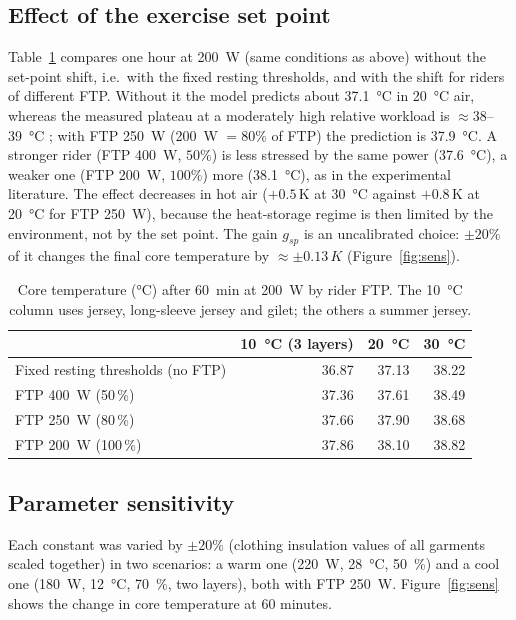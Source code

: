 \documentclass[11pt,a4paper]{article}
\begin{document}
\subsection{Effect of the exercise set point}
\label{sec:setpoint-results}
Table~\ref{tab:setpoint} compares one hour at \SI{200}{W} (same conditions as above) without the set-point shift, i.e.\ with the fixed resting thresholds, and with the shift for riders of different FTP. Without it the model predicts about \SI{37.1}{\degreeCelsius} in \SI{20}{\degreeCelsius} air, whereas the measured plateau at a moderately high relative workload is \(\approx38\)--\SI{39}{\degreeCelsius} \citep{saltin1966}; with FTP \SI{250}{W} (\SI{200}{W} \(=80\%\) of FTP) the prediction is \SI{37.9}{\degreeCelsius}. A stronger rider (FTP \SI{400}{W}, \(50\%\)) is less stressed by the same power (\SI{37.6}{\degreeCelsius}), a weaker one (FTP \SI{200}{W}, \(100\%\)) more (\SI{38.1}{\degreeCelsius}), as in the experimental literature. The effect decreases in hot air (\(+0.5\)\,K at \SI{30}{\degreeCelsius} against \(+0.8\)\,K at \SI{20}{\degreeCelsius} for FTP \SI{250}{W}), because the heat-storage regime is then limited by the environment, not by the set point. The gain \(g_{sp}\) is an uncalibrated choice: \(\pm20\%\) of it changes the final core temperature by \(\approx\pm0.13\,\si{K}\) (Figure~\ref{fig:sens}).

\begin{table}[H]
\centering\small
\begin{tabular}{@{}lrrr@{}}
\toprule
 & \SI{10}{\degreeCelsius} (3 layers) & \SI{20}{\degreeCelsius} & \SI{30}{\degreeCelsius} \\
\midrule
Fixed resting thresholds (no FTP) & 36.87 & 37.13 & 38.22 \\
FTP \SI{400}{W} (50\,\%) & 37.36 & 37.61 & 38.49 \\
FTP \SI{250}{W} (80\,\%) & 37.66 & 37.90 & 38.68 \\
FTP \SI{200}{W} (100\,\%) & 37.86 & 38.10 & 38.82 \\
\bottomrule
\end{tabular}
\caption{Core temperature (\si{\degreeCelsius}) after \SI{60}{min} at \SI{200}{W} by rider FTP. The \SI{10}{\degreeCelsius} column uses jersey, long-sleeve jersey and gilet; the others a summer jersey.}\label{tab:setpoint}
\end{table}

\subsection{Parameter sensitivity}
\label{sec:thermal-sens}
Each constant was varied by \(\pm20\%\) (clothing insulation values of all garments scaled together) in two scenarios: a warm one (\SI{220}{W}, \SI{28}{\degreeCelsius}, \SI{50}{\percent}) and a cool one (\SI{180}{W}, \SI{12}{\degreeCelsius}, \SI{70}{\percent}, two layers), both with FTP \SI{250}{W}. Figure~\ref{fig:sens} shows the change in core temperature at 60 minutes.
\end{document}
